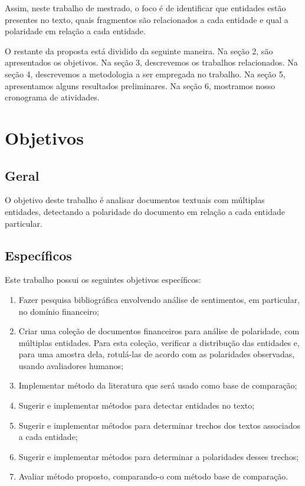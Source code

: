 \documentclass[a4paper,12pt]{article}
\begin{document}
Assim, neste trabalho de mestrado, o foco é de identificar que entidades estão presentes no texto, quais fragmentos são relacionados a cada entidade e qual a polaridade em relação a cada entidade.

O restante da proposta está dividido da seguinte maneira. Na seção 2, são apresentados os objetivos. Na seção 3, descrevemos os trabalhos relacionados. Na seção 4, descrevemos a metodologia a ser empregada no trabalho. Na seção 5, apresentamos alguns resultados preliminares. Na seção 6, mostramos nosso cronograma de atividades.

\section{Objetivos}

\subsection{Geral}

O objetivo deste trabalho é analisar documentos textuais com múltiplas entidades, detectando a polaridade do documento em relação a cada entidade particular.

\subsection{Específicos}

Este trabalho possui os seguintes objetivos específicos:

\begin{enumerate}
  \item Fazer pesquisa bibliográfica envolvendo análise de sentimentos, em particular, no domínio financeiro;
  \item Criar uma coleção de documentos financeiros para análise de polaridade, com múltiplas entidades. Para esta coleção, verificar a distribução das entidades e, para uma amostra dela, rotulá-las de acordo com as polaridades observadas, usando avaliadores humanos;
  \item Implementar método da literatura que será usado como base de comparação;
  \item Sugerir e implementar métodos para detectar entidades no texto;
  \item Sugerir e implementar métodos para determinar trechos dos textos associados a cada entidade;
  \item Sugerir e implementar métodos para determinar a polaridades desses trechos;
  \item Avaliar método proposto, comparando-o com método base de comparação.
\end{enumerate}
\end{document}
